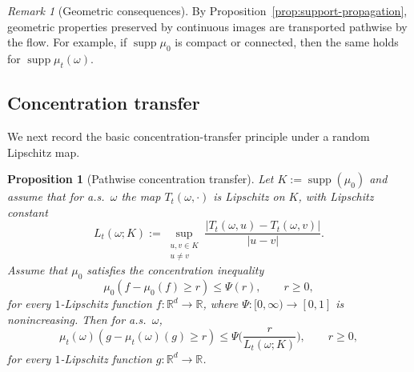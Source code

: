 \documentclass{tsp-short}
\newtheorem{proposition}{Proposition}[section]
\theoremstyle{remark}
\newtheorem{remark}{Remark}[section]
\theoremstyle{definition}
\begin{document}
\begin{remark}[Geometric consequences]
By Proposition~\ref{prop:support-propagation}, geometric properties preserved by continuous images are transported pathwise by the flow.
For example, if $\operatorname{supp}\mu_0$ is compact or connected, then the same holds for $\operatorname{supp}\mu_t(\omega)$.
\end{remark}

\subsection{Concentration transfer}

We next record the basic concentration-transfer principle under a random Lipschitz map.

\begin{proposition}[Pathwise concentration transfer]\label{prop:concentration-transfer}
Let $K:=\operatorname{supp}(\mu_0)$ and assume that for a.s.\ $\omega$ the map $T_t(\omega,\cdot)$ is Lipschitz on $K$, with Lipschitz constant
\begin{equation*}
L_t(\omega;K):=\sup_{\substack{u,v\in K\\u\neq v}}
\frac{|T_t(\omega,u)-T_t(\omega,v)|}{|u-v|}.
\end{equation*}
Assume that $\mu_0$ satisfies the concentration inequality
\begin{equation}\label{eq:general-concentration-mu0}
\mu_0(f-\mu_0(f)\ge r)\le \Psi(r),
\qquad r\ge0,
\end{equation}
for every $1$-Lipschitz function $f:\mathbb{R}^d\to\mathbb{R}$, where $\Psi:[0,\infty)\to[0,1]$ is nonincreasing.
Then for a.s.\ $\omega$,
\begin{equation}\label{eq:general-concentration-mut}
\mu_t(\omega)(g-\mu_t(\omega)(g)\ge r)
\le
\Psi\Big(\frac{r}{L_t(\omega;K)}\Big),
\qquad r\ge0,
\end{equation}
for every $1$-Lipschitz function $g:\mathbb{R}^d\to\mathbb{R}$.
\end{proposition}
\end{document}
